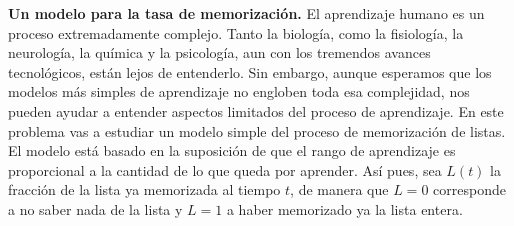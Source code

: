 \setcounter{ejercicio}{0}   %
\begin{ejercicio}[Tipo 1]\label{ej:memorizacion}
\textbf{Un modelo para la tasa de memorización.}
El aprendizaje humano es un proceso extremadamente complejo. Tanto la biología,
como la fisiología, la neurología, la química y la psicología, aun con los
tremendos avances tecnológicos, están lejos de entenderlo. Sin embargo, aunque
esperamos que los modelos más simples de aprendizaje no engloben toda esa
complejidad, nos pueden ayudar a entender aspectos limitados del proceso de
aprendizaje. En este problema vas a estudiar un modelo simple del proceso de
memorización de listas. El modelo está basado en la suposición de que el rango
de aprendizaje es proporcional a la cantidad de lo que queda por aprender. Así
pues, sea $L(t)$ la fracción de la lista ya memorizada al tiempo $t$, de manera
que $L=0$ corresponde a no saber nada de la lista y $L=1$ a haber memorizado ya
la lista entera.


\end{ejercicio}
